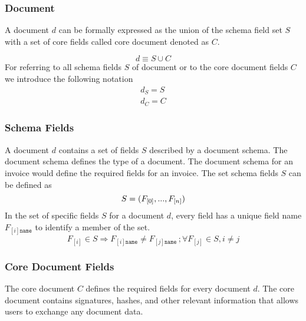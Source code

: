 \subsubsection{Document}
A document $d$  can be formally expressed as the union of the schema field set $S$ with a set of core fields called core document denoted as $C$.

\begin{equation}
d \equiv S \cup  C
\end{equation}
For referring to all schema fields $S$ of document or to the core document fields $C$ we introduce the following notation
\begin{eqnarray}
d_S = S \\
d_C = C
\end{eqnarray}

\subsubsection{Schema Fields}\label{sec:doc_schema_fields}
A document $d$ contains a set of fields $S$ described by a document schema. The document schema defines the type of a document. The document schema for an invoice would define the required fields for an invoice.
The set schema fields $S$ can be defined as
\begin{equation}
S = (F_{[0]},...,F_{[n]})\\
\end{equation}
In the set of specific fields $S$ for a document $d$, every field has a unique field name $F_{[i]\texttt{name}}$ to identify a member of the set.
\begin{equation}
F_{[i]} \in  S \Rightarrow F_{[i]\texttt{name}} \neq  F_{[j]\texttt{name}} \, ; \forall F_{[j]}  \in S, i \neq j 
\end{equation}

\subsubsection{Core Document Fields\label{Core Document}}\label{sec:doc_core_doc_fields}
The core document $C$ defines the required fields for every document $d$.
The core document contains signatures, hashes, and other relevant information that allows users to exchange any document data.
 
